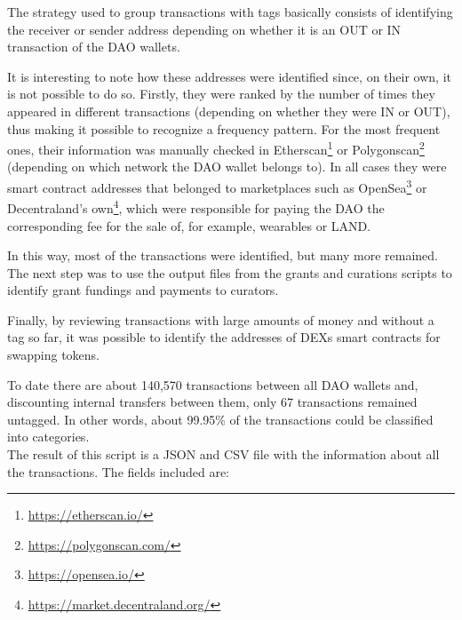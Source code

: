 \documentclass[MSE,Master,english]{twbook}%
\begin{document}
The strategy used to group transactions with tags basically consists of identifying the receiver or sender address depending on whether it is an OUT or IN transaction of the DAO wallets.

It is interesting to note how these addresses were identified since, on their own, it is not possible to do so. Firstly, they were ranked by the number of times they appeared in different transactions (depending on whether they were IN or OUT), thus making it possible to recognize a frequency pattern. For the most frequent ones, their information was manually checked in Etherscan\footnote{\url{https://etherscan.io/}} or Polygonscan\footnote{\url{https://polygonscan.com/}} (depending on which network the DAO wallet belongs to). In all cases they were smart contract addresses that belonged to marketplaces such as OpenSea\footnote{\url{https://opensea.io/}} or Decentraland's own\footnote{\url{https://market.decentraland.org/}}, which were responsible for paying the DAO the corresponding fee for the sale of, for example, wearables or LAND.

In this way, most of the transactions were identified, but many more remained. The next step was to use the output files from the grants and curations scripts to identify grant fundings and payments to curators.

Finally, by reviewing transactions with large amounts of money and without a tag so far, it was possible to identify the addresses of \ac{DEXs} smart contracts for swapping tokens.

To date there are about 140,570 transactions between all DAO wallets and, discounting internal transfers between them, only 67 transactions remained untagged. In other words, about 99.95\% of the transactions could be classified into categories. \\

The result of this script is a JSON and CSV file with the information about all the transactions. The fields included are:
\end{document}
